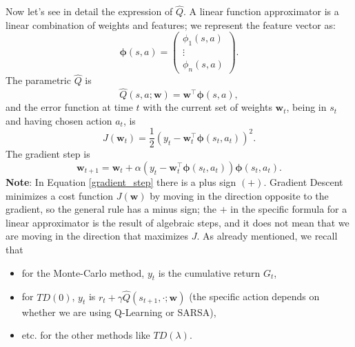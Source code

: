 \documentclass[10pt, a4paper]{report}
\begin{document}
Now let's see in detail the expression of $\hat Q$. A linear function approximator is a linear combination of weights and features; we represent the feature vector as:\begin{equation}
   \boldsymbol{\phi}(s,a)=\begin{pmatrix}
    \phi_1(s,a)\\\vdots\\\phi_n(s,a)
   \end{pmatrix}.
\end{equation}
The parametric $\hat Q$ is\begin{equation}
    \hat Q(s,a;\mathbf w)=\mathbf w^\top\boldsymbol{\phi}(s,a),
\end{equation}
and the error function at time $t$ with the current set of weights $\mathbf w_t$, being in $s_t$ and having chosen action $a_t$, is\begin{equation}
   \boxed{J(\mathbf w_t)=\frac{1}{2}\left(
        y_t-\mathbf w_t^\top\boldsymbol{\phi}(s_t,a_t)
    \right)^2}.
\end{equation}
The gradient step is\begin{equation}\label{gradient_step}
    \boxed{\mathbf w_{t+1}=\mathbf w_t+\alpha\left(
        y_t-\mathbf w_t^\top\boldsymbol{\phi}(s_t,a_t)
    \right)\boldsymbol{\phi}(s_t,a_t)}.
\end{equation}
\textbf{Note}: In Equation \eqref{gradient_step} there is a plus sign $(+)$. Gradient Descent minimizes a cost function $J(\mathbf w)$ by moving in the direction opposite to the gradient, so the general rule has a minus sign; the $+$ in the specific formula for a linear approximator is the result of algebraic steps, and it does not mean that we are moving in the direction that maximizes $J$. As already mentioned, we recall that\begin{itemize}
    \item for the Monte-Carlo method, $y_t$ is the cumulative return $G_t$,
    \item for $TD(0)$, $y_t$ is $r_t+\gamma\hat Q(s_{t+1},\cdot;\mathbf w)$ (the specific action depends on whether we are using Q-Learning or SARSA),
    \item etc. for the other methods like $TD(\lambda)$.
\end{itemize}
\end{document}
